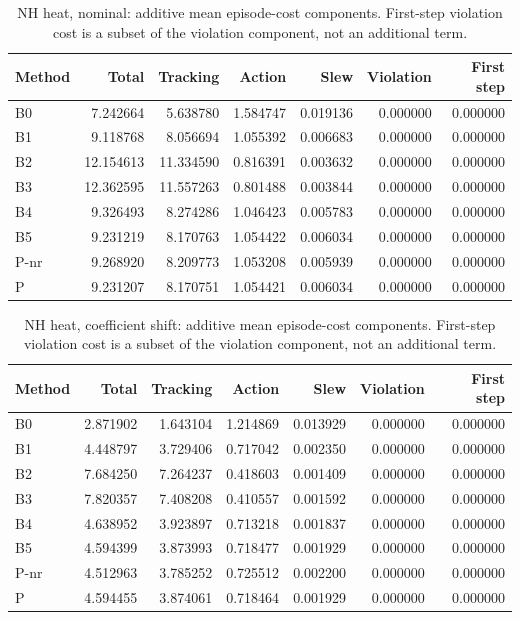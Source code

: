 \begin{table}[ht]
\centering\small
\caption{NH heat, nominal: additive mean episode-cost components. First-step violation cost is a subset of the violation component, not an additional term.}\label{tab:new_heat_costparts_locked_nominal}
\begin{tabular}{@{}lrrrrrr@{}}\toprule
Method & Total & Tracking & Action & Slew & Violation & First step\\\midrule
B0 & 7.242664 & 5.638780 & 1.584747 & 0.019136 & 0.000000 & 0.000000\\
B1 & 9.118768 & 8.056694 & 1.055392 & 0.006683 & 0.000000 & 0.000000\\
B2 & 12.154613 & 11.334590 & 0.816391 & 0.003632 & 0.000000 & 0.000000\\
B3 & 12.362595 & 11.557263 & 0.801488 & 0.003844 & 0.000000 & 0.000000\\
B4 & 9.326493 & 8.274286 & 1.046423 & 0.005783 & 0.000000 & 0.000000\\
B5 & 9.231219 & 8.170763 & 1.054422 & 0.006034 & 0.000000 & 0.000000\\
P-nr & 9.268920 & 8.209773 & 1.053208 & 0.005939 & 0.000000 & 0.000000\\
P & 9.231207 & 8.170751 & 1.054421 & 0.006034 & 0.000000 & 0.000000\\
\bottomrule\end{tabular}
\end{table}

\begin{table}[ht]
\centering\small
\caption{NH heat, coefficient shift: additive mean episode-cost components. First-step violation cost is a subset of the violation component, not an additional term.}\label{tab:new_heat_costparts_locked_coefficient_ood}
\begin{tabular}{@{}lrrrrrr@{}}\toprule
Method & Total & Tracking & Action & Slew & Violation & First step\\\midrule
B0 & 2.871902 & 1.643104 & 1.214869 & 0.013929 & 0.000000 & 0.000000\\
B1 & 4.448797 & 3.729406 & 0.717042 & 0.002350 & 0.000000 & 0.000000\\
B2 & 7.684250 & 7.264237 & 0.418603 & 0.001409 & 0.000000 & 0.000000\\
B3 & 7.820357 & 7.408208 & 0.410557 & 0.001592 & 0.000000 & 0.000000\\
B4 & 4.638952 & 3.923897 & 0.713218 & 0.001837 & 0.000000 & 0.000000\\
B5 & 4.594399 & 3.873993 & 0.718477 & 0.001929 & 0.000000 & 0.000000\\
P-nr & 4.512963 & 3.785252 & 0.725512 & 0.002200 & 0.000000 & 0.000000\\
P & 4.594455 & 3.874061 & 0.718464 & 0.001929 & 0.000000 & 0.000000\\
\bottomrule\end{tabular}
\end{table}

